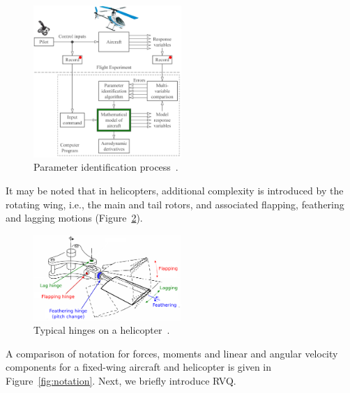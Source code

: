 \documentclass{article}
\begin{document}
\begin{figure}[t]
\centering	
\includegraphics[width=0.5\textwidth]{figs/HELI_parameterID.pdf}
\caption{Parameter identification process~\cite{2012_BOOK_Flight_Cook}.} 
\label{fig:parameterID}				
\end{figure}

It may be noted that in helicopters, additional complexity is introduced by the rotating wing, i.e., the main and tail rotors, and associated flapping, feathering and lagging motions (Figure~\ref{fig:hinges}).  

\begin{figure}[h]
\centering
\includegraphics[width=0.5\textwidth]{figs/HELICOPTER_hinges.pdf}
\caption{Typical hinges on a helicopter~\cite{2001_BOOK_Heli_Bramwell}.}
\label{fig:hinges}
\end{figure}

A comparison of notation for forces, moments and linear and angular velocity components for a fixed-wing aircraft and helicopter is given in Figure~\ref{fig:notation}.  Next, we briefly introduce RVQ.
\end{document}

